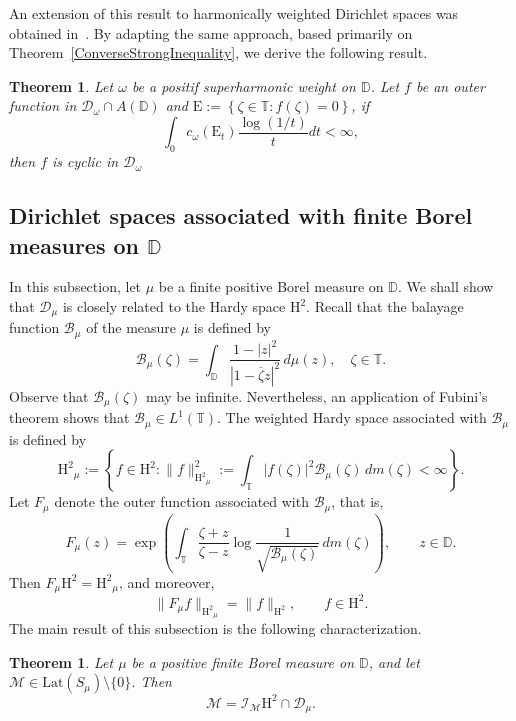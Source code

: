 \documentclass[12pt,reqno,a4paper]{amsart}
\newtheorem{theo}[prop]{Theorem}
\newcommand{\cM}{{\mathcal{M}}}
\newcommand{\hH}{\mathrm{H^2 }}
\newcommand{\Ee}{\mathrm{E}}
\newcommand\TT{\mathbb{T}}
\newcommand\DD{\mathbb{D}}
\newcommand{\cD}{{\mathcal{D}}}
\numberwithin{equation}{section}
\begin{document}
	An extension of this result to harmonically weighted Dirichlet spaces was obtained in~\cite{EL}. By adapting the same approach, based primarily on Theorem~\ref{ConverseStrongInequality}, we derive the following result.
	\begin{theo}\label{Th4}
		Let $\omega$ be a positif superharmonic weight on $\DD$. Let $f $ be an outer function in $ \cD_\omega \cap A(\DD) $
		and $\Ee:=\left\lbrace \zeta \in \TT : f(\zeta)=0    \right\rbrace $, if
		\begin{equation*}\label{CS-Cycl}
			\int_{0}c_\omega (\Ee_t)\frac{\log(1/t)}{t}dt <\infty,
		\end{equation*}
		then $f$ is cyclic in $\cD_\omega$
	\end{theo}
	
	\subsection{Dirichlet spaces associated with finite Borel measures on $\DD$}
	
	
	
	
	
	
	In this subsection, let $\mu$ be a finite positive Borel measure on $\DD$.  We shall show that $\cD_\mu$ is closely related to the Hardy space $\hH$. Recall that the balayage function $\mathcal{B}_{\mu}$ of the measure $\mu$ is defined by 
	\begin{equation*}
		\mathcal{B}_{\mu}(\zeta) = \int_\DD \frac{1 - |z|^2}{|1 - \overline{\zeta} z|^2} \, d\mu(z), \quad \zeta \in \TT.
	\end{equation*}
	Observe that $\mathcal{B}_{\mu}(\zeta)$ may be infinite. Nevertheless, an application of Fubini's theorem shows that $\mathcal{B}_{\mu} \in L^1(\TT)$. The weighted Hardy space associated with $\mathcal{B}_{\mu}$ is defined by
	\[
	\hH_{\mu} := \left\{ f \in \hH : \|f\|_{\hH_{\mu}}^2 := \int_{\TT} |f(\zeta)|^2 \mathcal{B}_{\mu}(\zeta)\, dm(\zeta) < \infty \right\}.
	\]
	Let $F_{\mu}$ denote the outer function associated with $\mathcal{B}_{\mu}$, that is,
	\[
	F_{\mu}(z) = \exp\left( \int_\TT \frac{\zeta + z}{\zeta - z} \log \frac{1}{\sqrt{\mathcal{B}_{\mu}(\zeta)}} \, dm(\zeta) \right), 
	\qquad z \in \DD.
	\]
	Then $F_{\mu} \hH = \hH_{\mu}$, and moreover,
	\[
	\|F_{\mu} f\|_{\hH_{\mu}} = \|f\|_{\hH}, 
	\qquad f \in \hH.
	\]
	The main result of this subsection is the following characterization.
	\begin{theo}
		Let $\mu$ be a positive finite Borel measure on $\DD$, and let $\cM \in \mathrm{Lat}(S_\mu)\setminus\{0\}$. Then
		$$
		\cM = \mathcal{I}_{\cM} \hH \cap \cD_\mu.
		$$
	\end{theo}
	
\end{document}
